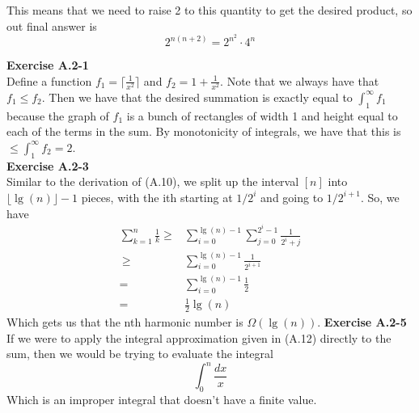 \documentclass{article}
\begin{document}
This means that we need to raise 2 to this quantity to get the desired product, so out final answer is
\[
2^{n(n+2)} = 2^{n^2} \cdot 4^n
\]

\noindent\textbf{Exercise A.2-1}\\
Define a function $f_1 = \lceil \frac{1}{x^2} \rceil$ and $f_2 = 1+ \frac{1}{x^2}$. Note that we always have that $f_1 \le f_2$. Then we have that the desired summation is exactly equal to $\int_1^\infty f_1$ because the graph of $f_1$ is a bunch of rectangles of width 1 and height equal to each of the terms in the sum. By monotonicity of integrals, we have that this is $ \le \int_1^\infty f_2 =2$. \\

\noindent\textbf{Exercise A.2-3}\\
Similar to the derivation of (A.10), we split up the interval $[n]$ into $\lfloor \lg(n)\rfloor-1$ pieces, with the ith starting at $1/2^i$ and going to $1/2^{i+1}$. So, we have
\begin{align*}
\sum_{k=1}^n \frac{1}{k} \ge& \sum_{i=0}^{\lg(n)-1} \sum_{j=0}^{2^i-1} \frac{1}{2^i+j}\\\
\ge& \sum_{i=0}^{\lg(n)-1} \frac{1}{2^{i+1}}\\
=&\sum_{i=0}^{\lg(n)-1} \frac{1}{2}\\
=&\frac{1}{2}\lg(n)
\end{align*}
Which gets us that the nth harmonic number is $\Omega(\lg(n))$.
\noindent\textbf{Exercise A.2-5}\\
If we were to apply the integral approximation given in (A.12) directly to the sum, then we would be trying to evaluate the integral
\[
\int_0^n \frac{dx}{x}
\]
Which is an improper integral that doesn't have a finite value.
\end{document}
